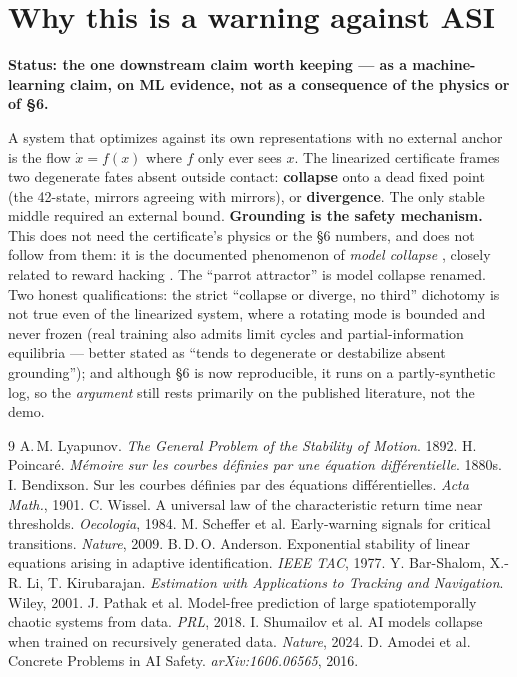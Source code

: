 \documentclass[11pt]{article}
\theoremstyle{definition}
\begin{document}
\section{Why this is a warning against ASI}
\begin{verifybox}
\textbf{Status: the one downstream claim worth keeping --- as a machine-learning
claim, on ML evidence, not as a consequence of the physics or of \S6.}
\end{verifybox}
A system that optimizes against its own representations with no external anchor is
the flow $\dot x = f(x)$ where $f$ only ever sees $x$. The linearized certificate
frames two degenerate fates absent outside contact: \textbf{collapse} onto a dead
fixed point (the 42-state, mirrors agreeing with mirrors), or \textbf{divergence}.
The only stable middle required an external bound. \textbf{Grounding is the safety
mechanism.} This does not need the certificate's physics or the \S6 numbers, and does not follow from them: it is
the documented phenomenon of \emph{model collapse} \cite{shumailov2024}, closely
related to reward hacking \cite{amodei2016}. The ``parrot attractor'' is model
collapse renamed. Two honest qualifications: the strict ``collapse or diverge, no
third'' dichotomy is not true even of the linearized system, where a rotating mode is bounded and never frozen
(real training also admits limit cycles and partial-information equilibria --- better stated as ``tends to degenerate
or destabilize absent grounding''); and although \S6 is now reproducible, it runs on a
partly-synthetic log, so the \emph{argument} still rests primarily on the published
literature, not the demo.

\begin{thebibliography}{9}
 A.\,M. Lyapunov.
  \emph{The General Problem of the Stability of Motion}. 1892.
 H. Poincar\'e.
  \emph{M\'emoire sur les courbes d\'efinies par une \'equation diff\'erentielle}. 1880s.
 I. Bendixson.
  Sur les courbes d\'efinies par des \'equations diff\'erentielles. \emph{Acta Math.}, 1901.
 C. Wissel.
  A universal law of the characteristic return time near thresholds. \emph{Oecologia}, 1984.
 M. Scheffer et al.
  Early-warning signals for critical transitions. \emph{Nature}, 2009.
 B.\,D.\,O. Anderson.
  Exponential stability of linear equations arising in adaptive identification. \emph{IEEE TAC}, 1977.
 Y. Bar-Shalom, X.-R. Li, T. Kirubarajan.
  \emph{Estimation with Applications to Tracking and Navigation}. Wiley, 2001.
 J. Pathak et al.
  Model-free prediction of large spatiotemporally chaotic systems from data. \emph{PRL}, 2018.
 I. Shumailov et al.
  AI models collapse when trained on recursively generated data. \emph{Nature}, 2024.
 D. Amodei et al.
  Concrete Problems in AI Safety. \emph{arXiv:1606.06565}, 2016.
\end{thebibliography}
\end{document}
